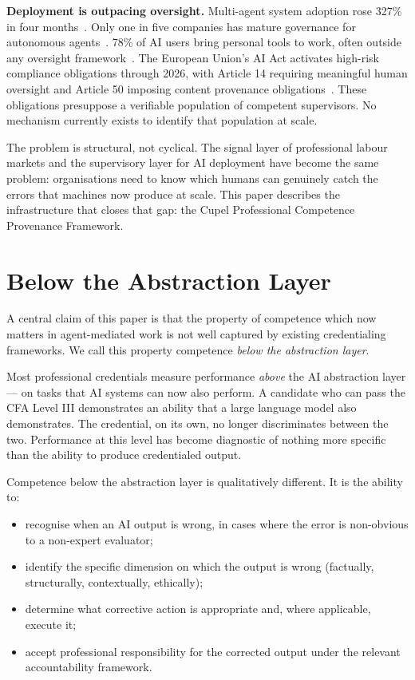 \documentclass[11pt,a4paper]{article}
\begin{document}
\textbf{Deployment is outpacing oversight.} Multi-agent system adoption rose 327\% in four
months~\cite{databricks2026}. Only one in five companies has mature governance for autonomous
agents~\cite{deloitte2026}. 78\% of AI users bring personal tools to work, often outside any
oversight framework~\cite{aigov2025}. The European Union's AI Act activates high-risk compliance
obligations through 2026, with Article 14 requiring meaningful human oversight and Article 50
imposing content provenance obligations~\cite{euaiact2024}. These obligations presuppose a
verifiable population of competent supervisors. No mechanism currently exists to identify that
population at scale.

The problem is structural, not cyclical. The signal layer of professional labour markets and the
supervisory layer for AI deployment have become the same problem: organisations need to know which
humans can genuinely catch the errors that machines now produce at scale. This paper describes the
infrastructure that closes that gap: the Cupel Professional Competence Provenance Framework.

\section{Below the Abstraction Layer}

A central claim of this paper is that the property of competence which now matters in
agent-mediated work is not well captured by existing credentialing frameworks. We call this
property competence \emph{below the abstraction layer}.

Most professional credentials measure performance \emph{above} the AI abstraction layer — on
tasks that AI systems can now also perform. A candidate who can pass the CFA Level III
demonstrates an ability that a large language model also demonstrates. The credential, on its own,
no longer discriminates between the two. Performance at this level has become diagnostic of
nothing more specific than the ability to produce credentialed output.

Competence below the abstraction layer is qualitatively different. It is the ability to:

\begin{itemize}[noitemsep]
  \item recognise when an AI output is wrong, in cases where the error is non-obvious to a
        non-expert evaluator;
  \item identify the specific dimension on which the output is wrong (factually, structurally,
        contextually, ethically);
  \item determine what corrective action is appropriate and, where applicable, execute it;
  \item accept professional responsibility for the corrected output under the relevant
        accountability framework.
\end{itemize}
\end{document}
